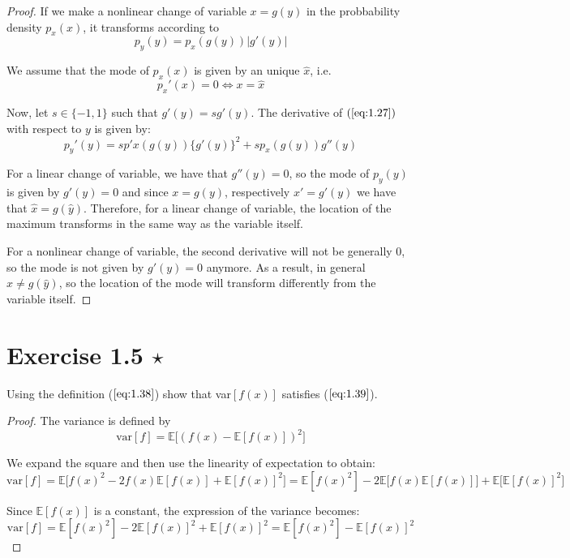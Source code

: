 \vspace{1em}

\begin{proof}
    If we make a nonlinear change of variable $x = g(y)$ in the probbability density 
    $p_x(x)$, it transforms according to
    \begin{equation*}
        p_y(y) = p_x(g(y)) |g'(y)|
        \tag{1.27}\label{eq:1.27}
    \end{equation*}

    We assume that the mode of $p_x(x)$ is given by an unique $\widehat{x}$, i.e.
     \[
         p_x'(x) = 0 \iff x = \widehat{x}
    \] 

    Now, let $s \in \{-1, 1\}$ such that $g'(y) = sg'(y)$. 
    The derivative of  $(\ref{eq:1.27})$ with respect to $y$ is given by:
    \[
        p_y'(y) = sp'x(g(y))\{g'(y)\}^2 + sp_x(g(y))g''(y)
    \] 

    For a linear change of variable, we have that $g''(y) = 0$, so the mode of $p_y(y)$ 
    is given by $g'(y) = 0$ and since $x = g(y)$, respectively $x' = g'(y)$ we have that
    $\widehat{x} = g(\widehat{y})$. Therefore, for a linear change of variable, the location
    of the maximum transforms in the same way as the variable itself.

    For a nonlinear change of variable, the second derivative will not be generally 0, so
    the mode is not given by $g'(y) = 0$ anymore. As a result, in general $\widehat{x} \neq g(\widehat{y})$,
    so the location of the mode will transform differently from the variable itself.
\end{proof}

\section*{Exercise 1.5 $\star$}
Using the definition ($\ref{eq:1.38}$) show that var$[f(x)]$ satisfies ($\ref{eq:1.39}$).

\vspace{1em}

\begin{proof}
    The variance is defined by 
    \begin{equation*}
        \text{var}[f] = \mathbb{E}\big[(f(x) - \mathbb{E}[f(x)])^2\big]
        \tag{1.38}\label{eq:1.38}
    \end{equation*}

    We expand the square and then use the linearity of expectation to obtain:
    \[
        \text{var}[f] 
        = \mathbb{E}\big[f(x)^2 - 2f(x)\mathbb{E}[f(x)] + \mathbb{E}[f(x)]^2\big]
        = \mathbb{E}[f(x)^2] - 2\mathbb{E}\big[f(x)\mathbb{E}[f(x)]\big] + \mathbb{E}\big[\mathbb{E}[f(x)]^2\big]
    \] 

    Since $\mathbb{E}[f(x)]$ is a constant, the expression of the variance becomes:
    \begin{equation*}
        \text{var}[f] 
        = \mathbb{E}[f(x)^2] - 2\mathbb{E}[f(x)]^2 + \mathbb{E}[f(x)]^2
        = \mathbb{E}[f(x)^2] - \mathbb{E}[f(x)]^2
        \tag{1.39}\label{eq:1.39}
    \end{equation*}
\end{proof}


